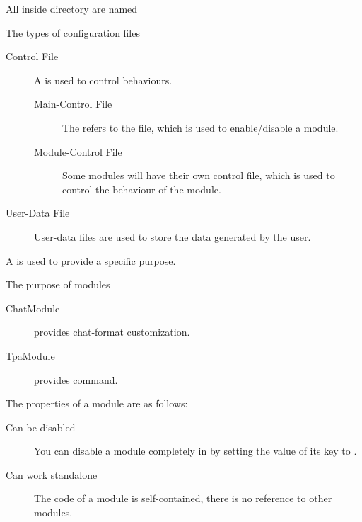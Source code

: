 \label{ch:concept}

All  inside  directory are named 

\begin{note}{The types of configuration files}
    \begin{description}
        \item[Control File] {A  is used to control behaviours.}
        \begin{description}
            \item[Main-Control File] The  refers to the  file, which is used to enable/disable a module.
            \item[Module-Control File] Some modules will have their own control file, which is used to control the behaviour of the module.
        \end{description}

        \item[User-Data File] User-data files are used to store the data generated by the user.
    \end{description}
\end{note}


\clearpage
{}

A  is used to provide a specific purpose.
\begin{example}{The purpose of modules}
    \begin{description}
        \item [ChatModule] provides chat-format customization.
        \item [TpaModule] provides  command.
    \end{description}
\end{example}

The properties of a module are as follows:
\begin{description}
    \item [Can be disabled] You can disable a module completely in  by setting the value of its  key to .
    \item [Can work standalone] The code of a module is self-contained, there is no reference to other modules.
\end{description}


